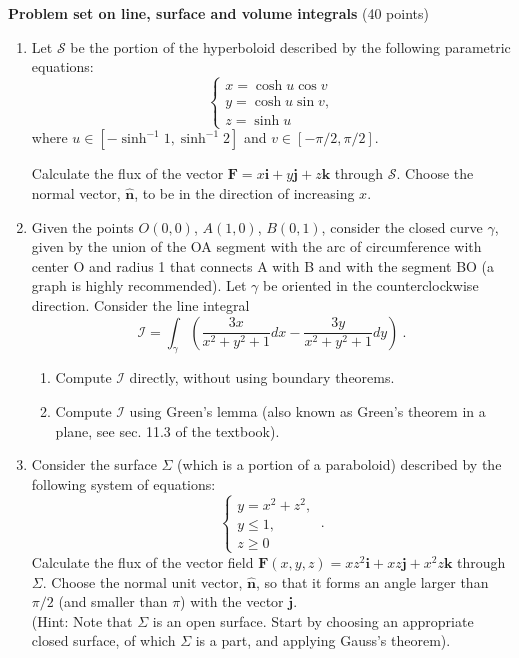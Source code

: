 \documentclass[fleqn]{article}
\begin{document}
  \textbf{Problem set on line, surface and volume integrals} (40 points)
  \begin{enumerate}

    \item Let ${\mathcal S}$ be the portion of the hyperboloid 
    described by the following parametric equations:
    \begin{equation} 
      \begin{cases} 
      x = \cosh u \cos v  \nonumber \\
      y = \cosh u \sin v,  \nonumber \\
      z = \sinh u  \nonumber 
      \end{cases}
    \end{equation} 
    where $u \in \left[-\sinh^{-1} 1, \sinh^{-1} 2 \right]$ and $v \in \left[-\pi/2, \pi/2 \right]$. 
    
    Calculate the flux of the vector $\mathbf{F} = x\mathbf{i }+ y\mathbf{j }+ z\mathbf{k}$ through ${\mathcal S}$. Choose the normal vector, $\mathbf{\hat{n}}$, to be in the direction of increasing $x$.
    
    
    \item Given the points $O (0, 0)$, $A (1, 0)$, $B (0, 1)$, consider the closed curve $\gamma$, given by the union of the OA segment
    with the arc of circumference with center O and radius 1 that connects A with B and with the segment BO (a graph is highly recommended). Let $\gamma$ be oriented in the 
    counterclockwise direction. Consider the line integral
    $${\mathcal I} = \int_{\gamma} \left(\frac{3x}{x^2 + y^2 +1} dx-\frac{3y}{x^2 + y^2 +1} dy
       \right)~.
       $$
      \begin{enumerate}
        \item Compute  ${\mathcal I}$ directly, without using boundary theorems. 
        
        \item Compute  ${\mathcal I}$ using Green's lemma (also known as Green's theorem in a plane, see sec. 11.3 of the textbook). 
      \end{enumerate}
    
    \item Consider the surface $\Sigma$  (which is a portion of  a paraboloid) described by the following system of equations: 
      \begin{equation} 
        \begin{cases} 
        y = x^2 + z^2,  \nonumber \\
        y\leq 1,  \nonumber \\
        z\geq 0  \nonumber 
        \end{cases}~.
      \end{equation} 
    Calculate the flux of the vector field $\mathbf{F}(x, y, z)= xz^2\mathbf{i }+ xz\mathbf{j} + x^2z\mathbf{k}$  through $\Sigma$.  Choose the normal unit vector,  $\mathbf{\hat{n}}$, so that it forms an angle larger than $\pi/2$ (and smaller than $\pi$) with the vector $\mathbf{j}$. \\
    (Hint: Note that $\Sigma$ is an open surface.  Start by choosing an appropriate closed surface, of which $\Sigma$ is a part, and applying Gauss's theorem). 
    

\end{enumerate}
\end{document}
